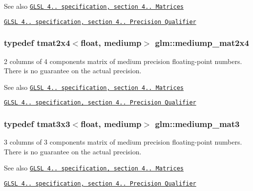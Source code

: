 \begin{DoxySeeAlso}{See also}
\href{http://www.opengl.org/registry/doc/GLSLangSpec.4.20.8.pdf}{\tt G\+L\+S\+L 4.. specification, section 4.. Matrices} 

\href{http://www.opengl.org/registry/doc/GLSLangSpec.4.20.8.pdf}{\tt G\+L\+S\+L 4.. specification, section 4.. Precision Qualifier} 
\end{DoxySeeAlso}
\hypertarget{namespaceglm_a7cfc44ca56d3efb0c65a64ed359e6ec4}{}
\subsubsection[{mediump\+\_\+mat2x4}]{\setlength{\rightskip}{0pt plus 5cm}typedef tmat2x4$<$float, mediump$>$ {\bf glm\+::mediump\+\_\+mat2x4}}\label{namespaceglm_a7cfc44ca56d3efb0c65a64ed359e6ec4}
2 columns of 4 components matrix of medium precision floating-\/point numbers. There is no guarantee on the actual precision.

\begin{DoxySeeAlso}{See also}
\href{http://www.opengl.org/registry/doc/GLSLangSpec.4.20.8.pdf}{\tt G\+L\+S\+L 4.. specification, section 4.. Matrices} 

\href{http://www.opengl.org/registry/doc/GLSLangSpec.4.20.8.pdf}{\tt G\+L\+S\+L 4.. specification, section 4.. Precision Qualifier} 
\end{DoxySeeAlso}
\hypertarget{namespaceglm_a41f782980f05801931ed7ae6f568275a}{}
\subsubsection[{mediump\+\_\+mat3}]{\setlength{\rightskip}{0pt plus 5cm}typedef tmat3x3$<$float, mediump$>$ {\bf glm\+::mediump\+\_\+mat3}}\label{namespaceglm_a41f782980f05801931ed7ae6f568275a}
3 columns of 3 components matrix of medium precision floating-\/point numbers. There is no guarantee on the actual precision.

\begin{DoxySeeAlso}{See also}
\href{http://www.opengl.org/registry/doc/GLSLangSpec.4.20.8.pdf}{\tt G\+L\+S\+L 4.. specification, section 4.. Matrices} 

\href{http://www.opengl.org/registry/doc/GLSLangSpec.4.20.8.pdf}{\tt G\+L\+S\+L 4.. specification, section 4.. Precision Qualifier} 
\end{DoxySeeAlso}
\hypertarget{namespaceglm_a12af91dfb7d3e26a5d69ca855b3f575f}{}
